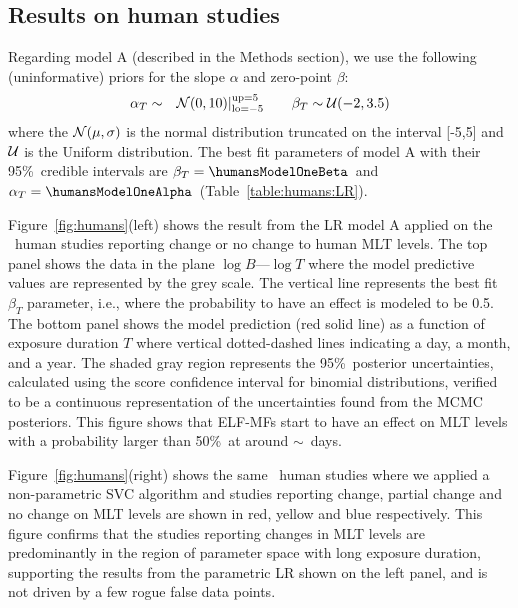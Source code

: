\documentclass[letter]{article}
\begin{document}
 
 
\subsection*{Results on human studies} 
\label{section:results:human}

Regarding model A (described in the Methods section), we use   the following (uninformative) priors for the slope $\alpha$ and zero-point $\beta$:
\begin{eqnarray}
\alpha_T&\sim& {\cal N}(0,10)|_{\rm lo=-5}^{\rm up=5}\qquad
\beta_T\sim{\cal U}(-2,3.5)\label{eq:priors:linearT}
\end{eqnarray}
where  the ${\cal N}(\mu,\sigma)$ is the normal distribution truncated on the interval [-5,5] and ${\cal U}$ is the Uniform distribution.
The best fit parameters of model A with their 95\%\ credible intervals are  $\beta_T=\humansModelOneBeta$\humansModelOneBetaErr\  and  $\alpha_T=\humansModelOneAlpha$\humansModelOneAlphaErr\ (Table~\ref{table:humans:LR}).

Figure~\ref{fig:humans}(left) shows the result from the LR model A applied on the \Nhums\ human studies reporting change or no change to human MLT levels. The top panel shows the data in the plane $\log B$---$\log T$ where the model predictive values are represented by the grey scale. The vertical line represents the best fit $\beta_T$ parameter, i.e., where the probability to have an effect is modeled to be 0.5.
The bottom panel shows the model prediction (red solid line) as a function of  exposure duration $T$   where vertical dotted-dashed lines indicating a day, a month, and a year.  The shaded gray region represents the 95\%\ posterior uncertainties, calculated using the \citet{Wilson1927} score confidence interval  for binomial distributions, verified to be a continuous representation of the uncertainties found from the MCMC posteriors.  
This figure shows that ELF-MFs start to have  an effect on MLT levels  with a probability larger than 50\%\ at around $\sim$\humansModelOneBetaDays~days. 

Figure~\ref{fig:humans}(right) shows the same  \Nhums\ human studies  where we applied a  non-parametric SVC algorithm  and studies reporting change, partial change and no change on MLT levels are shown in red, yellow and blue respectively.
This figure confirms that the studies reporting changes in MLT levels are predominantly in the region of parameter space with long exposure duration, supporting the results from the parametric LR shown on the left panel, and is not driven by a few rogue false data points. 
\end{document}
